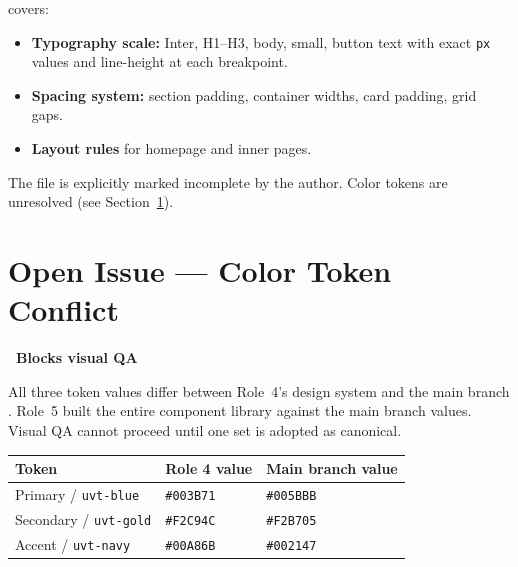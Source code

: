 \documentclass[12pt,a4paper]{article}
\begin{document}
 covers:

\begin{itemize}
    \item \textbf{Typography scale:} Inter, H1--H3, body, small, button text
          with exact \texttt{px} values and line-height at each breakpoint.
    \item \textbf{Spacing system:} section padding, container widths, card
          padding, grid gaps.
    \item \textbf{Layout rules} for homepage and inner pages.
\end{itemize}

The file is explicitly marked incomplete by the author. Color tokens are
unresolved (see Section~\ref{sec:conflict}).

\section{Open Issue --- Color Token Conflict}
\label{sec:conflict}

\begin{yellowbox}
\textbf{\color{uvtDarkBlue}\faExclamationTriangle\ Blocks visual QA}

\vspace{6pt}\color{textGray}
All three token values differ between Role~4's design system and the main
branch . Role~5 built the entire component library against
the main branch values. Visual QA cannot proceed until one set is adopted as
canonical.
\end{yellowbox}

\vspace{0.8em}

\begin{longtable}{@{}L{3.8cm}L{3.5cm}L{5.9cm}@{}}
\toprule
{}
\textbf{Token} & \textbf{Role 4 value} & \textbf{Main branch  value} \\
\midrule
\endhead
Primary / \texttt{uvt-blue} & \texttt{\#003B71} & \texttt{\#005BBB} \\
\addlinespace
Secondary / \texttt{uvt-gold} & \texttt{\#F2C94C} & \texttt{\#F2B705} \\
\addlinespace
Accent / \texttt{uvt-navy} & \texttt{\#00A86B} & \texttt{\#002147} \\
\bottomrule
\end{longtable}

\end{document}
